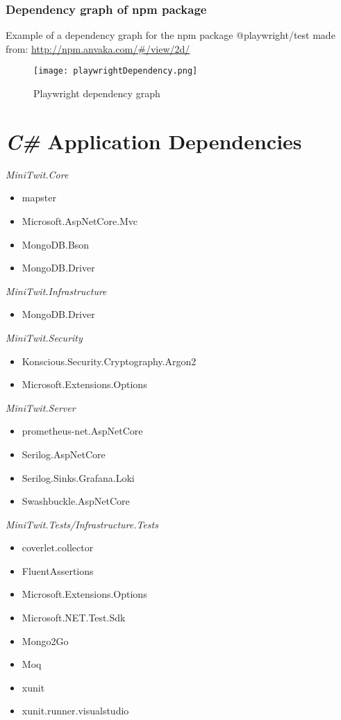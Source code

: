 \subsubsection{Dependency graph of npm package}
Example of a dependency graph for the npm package @playwright/test made from: \url{http://npm.anvaka.com/\#/view/2d/}

\begin{figure}[H]
    \centering
    \texttt{[image: playwrightDependency.png]}
    \caption{Playwright dependency graph}
    \label{fig:playwrightDependencies}
\end{figure}


\section{\textit{C\#} Application Dependencies}

\textit{MiniTwit.Core}
\begin{itemize}
    \item mapster
    \item Microsoft.AspNetCore.Mvc
    \item MongoDB.Bson
    \item MongoDB.Driver
\end{itemize}


\textit{MiniTwit.Infrastructure}
\begin{itemize}
    \item MongoDB.Driver
\end{itemize}

\textit{MiniTwit.Security}
\begin{itemize}
    \item Konscious.Security.Cryptography.Argon2
    \item Microsoft.Extensions.Options
\end{itemize}

\textit{MiniTwit.Server}
\begin{itemize}
    \item prometheus-net.AspNetCore  
    \item Serilog.AspNetCore    
    \item Serilog.Sinks.Grafana.Loki   
    \item Swashbuckle.AspNetCore 
\end{itemize}


\textit{MiniTwit.Tests/Infrastructure.Tests}
\begin{itemize}
   \item coverlet.collector 
   \item FluentAssertions  
   \item Microsoft.Extensions.Options   
   \item Microsoft.NET.Test.Sdk  
   \item Mongo2Go   
   \item Moq    
   \item xunit     
   \item xunit.runner.visualstudio  
\end{itemize}

